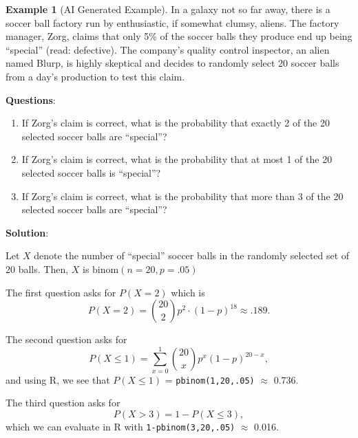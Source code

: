 \documentclass[
]{book}
\providecommand{\tightlist}{%
  \setlength{\itemsep}{0pt}\setlength{\parskip}{0pt}}
\theoremstyle{definition}
\theoremstyle{definition}
\newtheorem{example}{Example}[chapter]
\theoremstyle{definition}
\theoremstyle{definition}
\theoremstyle{remark}
\begin{document}
\begin{example}[AI Generated Example]
\protect\hypertarget{exm:binomial-AI-generated}{}\label{exm:binomial-AI-generated}In a galaxy not so far away, there is a soccer ball factory run by enthusiastic, if somewhat clumsy, aliens. The factory manager, Zorg, claims that only 5\% of the soccer balls they produce end up being ``special'' (read: defective). The company's quality control inspector, an alien named Blurp, is highly skeptical and decides to randomly select 20 soccer balls from a day's production to test this claim.

\textbf{Questions}:

\begin{enumerate}
\def\labelenumi{\arabic{enumi}.}
\tightlist
\item
  If Zorg's claim is correct, what is the probability that exactly 2 of the 20 selected soccer balls are ``special''?
\item
  If Zorg's claim is correct, what is the probability that at most 1 of the 20 selected soccer balls is ``special''?
\item
  If Zorg's claim is correct, what is the probability that more than 3 of the 20 selected soccer balls are ``special''?
\end{enumerate}

\textbf{Solution}:

Let \(X\) denote the number of ``special'' soccer balls in the randomly selected set of 20 balls. Then, \(X\) is \(\text{binom}(n=20,p=.05)\)

The first question asks for \(P(X = 2)\) which is \[P(X = 2) = \binom{20}{2} p^2 \cdot (1-p)^{18} \approx .189.\]

The second question asks for \[P(X \leq 1) = \sum_{x = 0}^1 \binom{20}{x}p^x(1-p)^{20-x},\]
and using R, we see that \(P(X \leq 1)\) = \texttt{pbinom(1,20,.05)} \(\approx\) 0.736.

The third question asks for \[P(X > 3) = 1 - P(X \leq 3),\]
which we can evaluate in R with
\texttt{1-pbinom(3,20,.05)} \(\approx\) 0.016.
\end{example}
\end{document}
